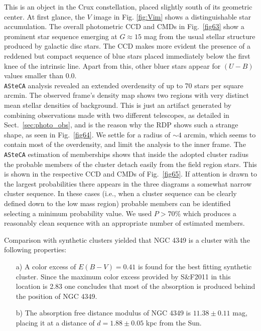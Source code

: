 \documentclass[draft]{aa}
\begin{document}
This is an object in the Crux constellation, placed slightly south of its
geometric center. At first glance, the $V$ image in Fig. \ref{fig:Vim} shows a
distinguishable star accumulation. The overall photometric CCD and CMDs in
Fig.~\ref{fig63} show a prominent star sequence emerging at $G\approx15$ mag
from the usual stellar structure produced by galactic disc stars.
The CCD makes more evident the presence of a reddened but compact sequence of
blue stars placed immediately below the first knee of the intrinsic line. Apart
from this, other bluer stars appear for $(U-B)$ values smaller than 0.0.\\ 

\texttt{ASteCA} analysis revealed an extended overdensity of up to 70 stars per
square arcmin. The observed frame's density map shows two regions with
very distinct mean stellar densities of background. This is just an artifact
generated by combining observations made with two different telescopes, as
detailed in Sect.~\ref{sec:photo_obs}, and is the reason why
the RDP shows such a strange shape, as seen in Fig.~\ref{fig64}. We
settle for a radius of $\sim4$ arcmin, which seems to contain most of the
overdensity, and limit the analysis to the inner frame.
%
The \texttt{ASteCA} estimation of memberships shows that inside the adopted
cluster radius the probable members of the cluster detach easily from the field
region stars. This is shown in the respective CCD and CMDs of Fig.~\ref{fig65}.
If attention is drawn to the largest probabilities there appears in the three
diagrams a somewhat narrow cluster sequence.
In these cases (i.e., when a cluster sequence can be clearly defined
down to the low mass region) probable members can be identified selecting a
minimum probability value. We used $P>70\%$ which produces a reasonably clean
sequence with an appropriate number of estimated members.

Comparison with synthetic clusters yielded that NGC 4349 is a cluster with the
following properties:

\begin{itemize}
\item [a)] A color excess of $E(B-V)=0.41$ is found for the best
fitting synthetic cluster. Since the maximum color excess provided by
S\&F2011 in this location is 2.83 one concludes that most of the
absorption is produced behind the position of NGC 4349.
\item [b)] The absorption free distance modulus of NGC 4349 is
$11.38\pm0.11$ mag, placing it at a distance of $d=1.88\pm0.05$ kpc from
the Sun.
\end{itemize}
\end{document}
